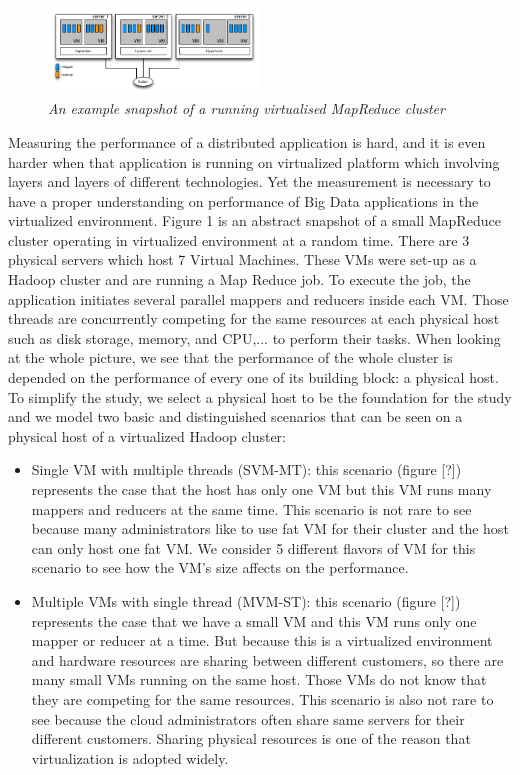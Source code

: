 \documentclass{acmsig}
\begin{document}
\begin{figure}[htbp]
    \centering
    \includegraphics[width=0.5\textwidth]{figures/cluster_snapshot.png}
    \caption{\textit{An example snapshot of a running virtualised MapReduce cluster}}
    \label{cluster_snapshot}
\end{figure}

Measuring the performance of a distributed application is hard, and it is even harder when that application is running on virtualized platform which involving layers and layers of different technologies. Yet the measurement is necessary to have a proper understanding on performance of Big Data applications in the virtualized environment. Figure 1 is an abstract snapshot of a small MapReduce cluster operating in virtualized environment at a random time. There are 3 physical servers which host 7 Virtual Machines. These VMs were set-up as a Hadoop cluster and are running a Map Reduce job. To execute the job, the application initiates several parallel mappers and reducers inside each VM. Those threads are concurrently competing for the same resources at each physical host such as disk storage, memory, and CPU,... to perform their tasks. When looking at the whole picture, we see that the performance of the whole cluster is depended on the performance of every one of its building block: a physical host. To simplify the study, we select a physical host to be the foundation for the study and we model two basic and distinguished scenarios that can be seen on a physical host of a virtualized Hadoop cluster:
\begin{itemize} 
\item Single VM with multiple threads (SVM-MT): this scenario (figure [?]) represents the case that the host has only one VM but this VM runs many mappers and reducers at the same time. This scenario is not rare to see because many administrators like to use fat VM for their cluster and the host can only host one fat VM. We consider 5 different flavors of VM for this scenario to see how the VM's size affects on the performance.
\item Multiple VMs with single thread (MVM-ST): this scenario (figure [?]) represents the case that we have a small VM and this VM runs only one mapper or reducer at a time. But because this is a virtualized environment and hardware resources are sharing between different customers, so there are many small VMs running on the same host. Those VMs do not know that they are competing for the same resources. This scenario is also not rare to see because the cloud administrators often share same servers for their different customers. Sharing physical resources is one of the reason that virtualization is adopted widely.
\end{itemize}
\end{document}
